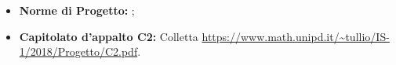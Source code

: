 \begin{itemize}
	\item \textbf{Norme di Progetto:} \NdP ;
	\item \textbf{Capitolato d'appalto C2: } Colletta \newline
		  \url{https://www.math.unipd.it/~tullio/IS-1/2018/Progetto/C2.pdf}.
\end{itemize}